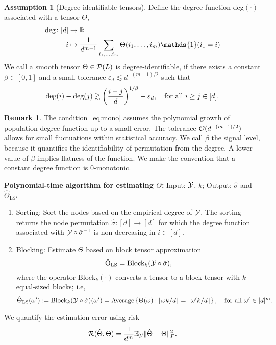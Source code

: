 \documentclass[10pt]{article}
\theoremstyle{definition}
\theoremstyle{definition}
\newtheorem{assumption}{Assumption}
\newtheorem{rmk}{Remark}
\theoremstyle{definition}
\begin{document}
\begin{assumption}[Degree-identifiable tensors]\label{ass:degree}
Define the degree function deg$(\cdot)$ associated with a tensor $\Theta$,
\begin{align}
\text{deg}\colon[d] & \to \mathbb{R}\\
i & \mapsto {1\over d^{m-1}}\sum_{i_1,\ldots,i_m} \Theta(i_1,\ldots,i_m)\mathds{1}(i_1=i)
\end{align}
We call a smooth tensor $\Theta\in\mathcal{P}(L)$ is degree-identifiable, if there exists a constant $\beta\in[0,1]$ and a small tolerance $\varepsilon_d\lesssim d^{-(m-1)/2}$ such that
\begin{equation}\label{eq:mono}
\text{deg}(i)-\text{deg}(j)\gtrsim \left({i-j\over d}\right)^{1/\beta}-\varepsilon_d, \quad \text{for all }i\geq j \in[d].
\end{equation}
\end{assumption}
\begin{rmk} 
The condition~\eqref{eq:mono} assumes the polynomial growth of population degree function up to a small error. The tolerance $\mathcal{O}(d^{-(m-1)/2})$ allows for small fluctuations within statistical accuracy. We call $\beta$ the signal level, because it quantifies the identifiability of permutation from the degree. A lower value  of $\beta$ implies flatness of the function. We make the convention that a constant degree function is $0$-monotonic. 
\end{rmk}
{\bf Polynomial-time algorithm for estimating $\Theta$:}
 Input: $\mathcal{Y}$, $k$; Output: $\hat \sigma$ and $\hat \Theta_{\text{LS}}$. 
\begin{enumerate}
\item Sorting: Sort the nodes based on the empirical degree of $\mathcal{Y}$. The sorting returns the node permutation $\hat \sigma\colon[d]\to[d]$ for which the degree function associated with $\mathcal{Y}\circ \hat \sigma^{-1}$ is non-decreasing in $i\in[d]$. 
\item Blocking: Estimate $\Theta$ based on block tensor approximation
\[
\hat \Theta_{\text{LS}}=\text{Block}_{k}(\mathcal{Y}\circ \hat \sigma),
\]
where the operator $\text{Block}_k(\cdot)$ converts a tensor to a block tensor with $k$ equal-sized blocks; i.e,
\begin{align}\label{eq:est}
\hat \Theta_{\text{LS}}(\omega'):=\text{Block}_{k}(\mathcal{Y}\circ \hat \sigma)(\omega')=\text{Average}\left\{\Theta(\omega)\colon \lfloor{\omega k/d}\rfloor = \lfloor{\omega' k/d}\rfloor \right\}, \quad \text{for all }\omega'\in[d]^m.
\end{align}
\end{enumerate}
We quantify the estimation error using risk
\[
\mathcal{R}(\hat \Theta, \Theta)={1\over d^m}\mathbb{E}_{\mathcal{Y}}\lVert\hat \Theta-\Theta\rVert_F^2.
\]
\end{document}
